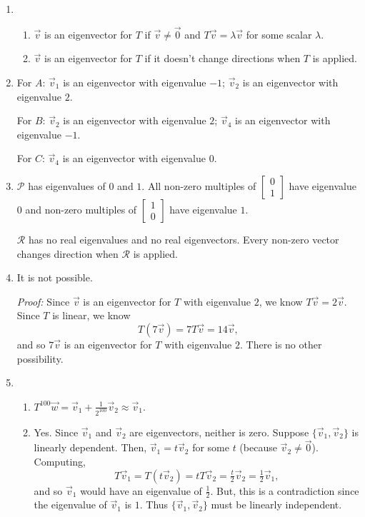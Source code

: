 \documentclass[red]{tutorial}
\newcommand{\mat}[1]{\begin{bmatrix}#1\end{bmatrix}}
\theoremstyle{definition}
\theoremstyle{theorem}
\begin{document}
	\begin{solutions}
		\begin{enumerate}
			\item \begin{enumerate}
					\item $\vec v$ is an eigenvector for $T$ if $\vec v\neq \vec 0$ and
						$T\vec v=\lambda \vec v$ for some scalar $\lambda$.
					\item $\vec v$ is an eigenvector for $T$ if it doesn't change directions
						when $T$ is applied.
			\end{enumerate}
			\item
				For $A$:
				$\vec v_1$ is an eigenvector with eigenvalue $-1$;
				$\vec v_2$ is an eigenvector with eigenvalue $2$.

				For $B$:
				$\vec v_2$ is an eigenvector with eigenvalue $2$;
				$\vec v_4$ is an eigenvector with eigenvalue $-1$.

				For $C$:
				$\vec v_4$ is an eigenvector with eigenvalue $0$.
			\item $\mathcal P$ has eigenvalues of $0$ and $1$. All non-zero multiples of $\mat{0\\1}$
				have eigenvalue $0$ and non-zero multiples of $\mat{1\\0}$ have eigenvalue $1$.

				$\mathcal R$ has no real eigenvalues and no real eigenvectors. Every non-zero
				vector changes direction when $\mathcal R$ is applied.
			\item It is not possible.

				\emph{Proof:} Since $\vec v$ is an eigenvector for $T$ with eigenvalue
				$2$, we know $T\vec v=2\vec v$. Since $T$ is linear, we know
				\[
					T(7\vec v)=7T\vec v=14\vec v,
				\]
				and so $7\vec v$ is an eigenvector for $T$ with eigenvalue $2$. There is no
				other possibility.
			\item \begin{enumerate}
				\item $T^{100}\vec w=\vec v_1+\tfrac{1}{2^{100}}\vec v_2 \approx \vec v_1$.
				\item Yes. Since $\vec v_1$ and $\vec v_2$ are eigenvectors, neither is zero.
				Suppose $\{\vec v_1,\vec v_2\}$ is linearly dependent. Then, $\vec v_1=t\vec v_2$
					for some $t$ (because $\vec v_2\neq \vec 0$). Computing,
					\[
						T\vec v_1=T(t\vec v_2)=tT\vec v_2=\tfrac{t}{2}\vec v_2 = \tfrac{1}{2}\vec v_1,
					\]
					and so $\vec v_1$ would have an eigenvalue of $\tfrac{1}{2}$. But, this
					is a contradiction since the eigenvalue
					of $\vec v_1$ is $1$. Thus $\{\vec v_1,\vec v_2\}$ must be linearly independent.


\end{enumerate}
\end{enumerate}
\end{solutions}
\end{document}
